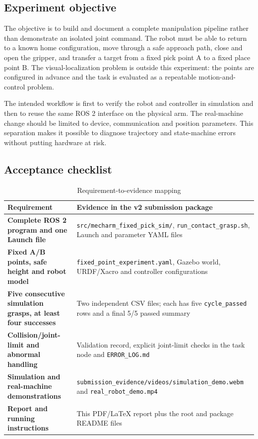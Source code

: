 \documentclass[11pt,a4paper]{article}
\newcommand{\code}[1]{\texttt{\footnotesize #1}}
\begin{document}
\subsection{Experiment objective}
The objective is to build and document a complete manipulation pipeline rather than demonstrate an isolated joint command. The robot must be able to return to a known home configuration, move through a safe approach path, close and open the gripper, and transfer a target from a fixed pick point A to a fixed place point B. The visual-localization problem is outside this experiment: the points are configured in advance and the task is evaluated as a repeatable motion-and-control problem.

The intended workflow is first to verify the robot and controller in simulation and then to reuse the same ROS 2 interface on the physical arm. The real-machine change should be limited to device, communication and position parameters. This separation makes it possible to diagnose trajectory and state-machine errors without putting hardware at risk.

\subsection{Acceptance checklist}
\begin{table}[H]
\centering\small
\caption{Requirement-to-evidence mapping}
\begin{tabularx}{\textwidth}{>{\bfseries}p{}X}
\toprule
Requirement & Evidence in the v2 submission package\\
\midrule
Complete ROS 2 program and one Launch file & \code{src/mecharm\_fixed\_pick\_sim/}, \code{run\_contact\_grasp.sh}, Launch and parameter YAML files\\
Fixed A/B points, safe height and robot model & \code{fixed\_point\_experiment.yaml}, Gazebo world, URDF/Xacro and controller configurations\\
Five consecutive simulation grasps, at least four successes & Two independent CSV files; each has five \code{cycle\_passed} rows and a final 5/5 passed summary\\
Collision/joint-limit and abnormal handling & Validation record, explicit joint-limit checks in the task node and \code{ERROR\_LOG.md}\\
Simulation and real-machine demonstrations & \code{submission\_evidence/videos/simulation\_demo.webm} and \code{real\_robot\_demo.mp4}\\
Report and running instructions & This PDF/LaTeX report plus the root and package README files\\
\bottomrule
\end{tabularx}
\end{table}
\end{document}
